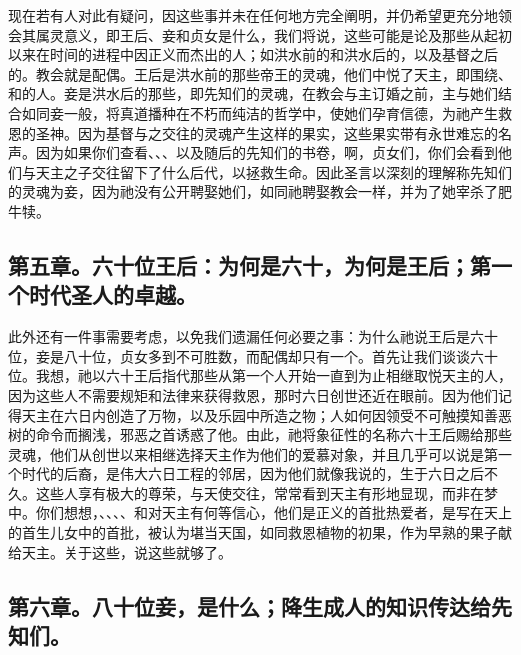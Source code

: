 现在若有人对此有疑问，因这些事并未在任何地方完全阐明，并仍希望更充分地领会其属灵意义，即王后、妾和贞女是什么，我们将说，这些可能是论及那些从起初以来在时间的进程中因正义而杰出的人；如洪水前的和洪水后的，以及基督之后的。教会就是配偶。王后是洪水前的那些帝王的灵魂，他们中悦了天主，即围绕、和的人。妾是洪水后的那些，即先知们的灵魂，在教会与主订婚之前，主与她们结合如同妾一般，将真道播种在不朽而纯洁的哲学中，使她们孕育信德，为祂产生救恩的圣神。因为基督与之交往的灵魂产生这样的果实，这些果实带有永世难忘的名声。因为如果你们查看、、、以及随后的先知们的书卷，啊，贞女们，你们会看到他们与天主之子交往留下了什么后代，以拯救生命。因此圣言以深刻的理解称先知们的灵魂为妾，因为祂没有公开聘娶她们，如同祂聘娶教会一样，并为了她宰杀了肥牛犊。\par


\subsection{第五章。六十位王后：为何是六十，为何是王后；第一个时代圣人的卓越。}

此外还有一件事需要考虑，以免我们遗漏任何必要之事：为什么祂说王后是六十位，妾是八十位，贞女多到不可胜数，而配偶却只有一个。首先让我们谈谈六十位。我想，祂以六十王后指代那些从第一个人开始一直到为止相继取悦天主的人，因为这些人不需要规矩和法律来获得救恩，那时六日创世还近在眼前。因为他们记得天主在六日内创造了万物，以及乐园中所造之物；人如何因领受不可触摸知善恶树的命令而搁浅，邪恶之首诱惑了他。由此，祂将象征性的名称六十王后赐给那些灵魂，他们从创世以来相继选择天主作为他们的爱慕对象，并且几乎可以说是第一个时代的后裔，是伟大六日工程的邻居，因为他们就像我说的，生于六日之后不久。这些人享有极大的尊荣，与天使交往，常常看到天主有形地显现，而非在梦中。你们想想，、、、、和对天主有何等信心，他们是正义的首批热爱者，是写在天上的首生儿女中的首批，被认为堪当天国，如同救恩植物的初果，作为早熟的果子献给天主。关于这些，说这些就够了。\par


\subsection{第六章。八十位妾，是什么；降生成人的知识传达给先知们。}

